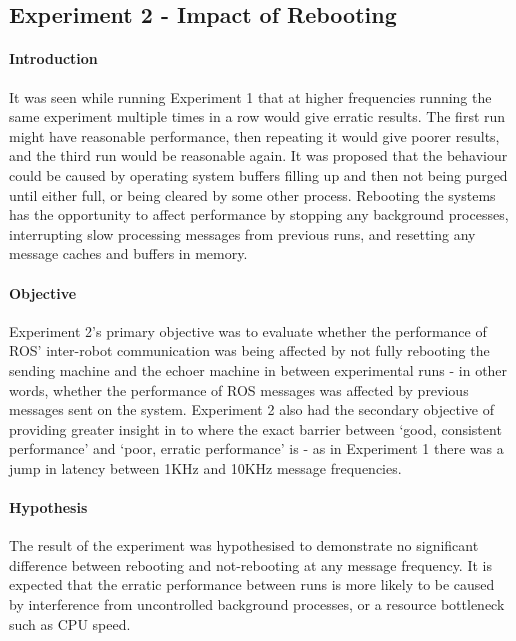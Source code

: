 \documentclass[../dissertation.tex]{subfiles}
\begin{document}
\subsection{Experiment 2 - Impact of Rebooting}
\label{exp-2}

\paragraph{Introduction} It was seen while running Experiment 1 that at higher frequencies running the same experiment multiple times in a row would give erratic results. The first run might have reasonable performance, then repeating it would give poorer results, and the third run would be reasonable again. It was proposed that the behaviour could be caused by operating system buffers filling up and then not being purged until either full, or being cleared by some other process. Rebooting the systems has the opportunity to affect performance by stopping any background processes, interrupting slow processing messages from previous runs, and resetting any message caches and buffers in memory.

\paragraph{Objective} Experiment 2's primary objective was to evaluate whether the performance of ROS' inter-robot communication was being affected by not fully rebooting the sending machine and the echoer machine in between experimental runs - in other words, whether the performance of ROS messages was affected by previous messages sent on the system. Experiment 2 also had the secondary objective of providing greater insight in to where the exact barrier between `good, consistent performance' and `poor, erratic performance' is - as in Experiment 1 there was a jump in latency between 1KHz and 10KHz message frequencies.

\paragraph{Hypothesis} The result of the experiment was hypothesised to demonstrate no significant difference between rebooting and not-rebooting at any message frequency. It is expected that the erratic performance between runs is more likely to be caused by interference from uncontrolled background processes, or a resource bottleneck such as CPU speed.
\end{document}
